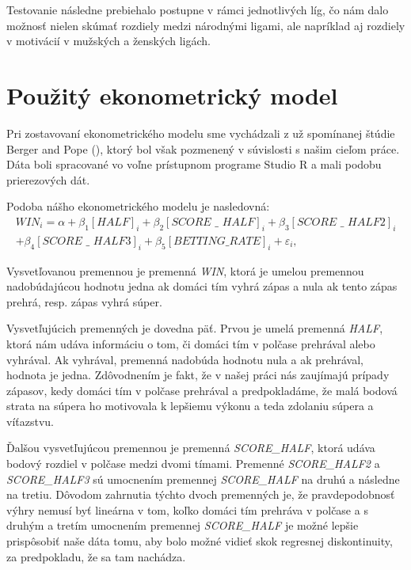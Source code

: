 \documentclass[
  digital, %
  oneside, %
  notable,   %
  lof,     %
  lot,     %
]{fithesis3}
\begin{document}
		Testovanie následne prebiehalo postupne v rámci jednotlivých líg, čo nám dalo možnosť nielen skúmať rozdiely medzi národnými ligami, ale napríklad aj rozdiely v motivácií v mužských a ženských ligách.
		
		\section{Použitý ekonometrický model}
		\label{sec:pouzitymodel}
		Pri zostavovaní ekonometrického modelu sme vychádzali z už spomínanej štúdie Berger and Pope (\citeyear{berger2011}), ktorý bol však pozmenený v súvislosti s našim cieľom práce. Dáta boli spracované vo voľne prístupnom programe Studio R a mali podobu prierezových dát.
		
		Podoba nášho ekonometrického modelu je nasledovná:
		\begin{multline}
		WIN_{i} = \alpha + \beta _{1} [\textit{HALF}]_{i} + \beta _{2} [\textit{SCORE~\_~HALF}]_{i} + \beta _{3} [\textit{SCORE~\_~HALF2}]_{i} \\
		+ \beta _{4} [\textit{SCORE~\_~HALF3}]_{i} + \beta _{5} [\textit{BETTING\_RATE}]_{i} + \varepsilon_{i},
		\end{multline}
		
		Vysvetľovanou premennou je premenná \textit{WIN}, ktorá je umelou premennou nadobúdajúcou hodnotu jedna ak domáci tím vyhrá zápas a nula ak tento zápas prehrá, resp. zápas vyhrá súper. 
		
		Vysvetľujúcich premenných je dovedna päť. Prvou je umelá premenná \textit{HALF}, ktorá nám udáva informáciu o tom, či domáci tím v polčase prehrával alebo vyhrával. Ak vyhrával, premenná nadobúda hodnotu nula a ak prehrával, hodnota je jedna. Zdôvodnením je fakt, že v našej práci nás zaujímajú prípady zápasov, kedy domáci tím v polčase prehrával a predpokladáme, že malá bodová strata na súpera ho motivovala k lepšiemu výkonu a teda zdolaniu súpera a víťazstvu. 
		
		Ďalšou vysvetľujúcou premennou je premenná \textit{SCORE\_HALF}, ktorá udáva bodový rozdiel v polčase medzi dvomi tímami. Premenné \textit{SCORE\_HALF2} a \textit{SCORE\_HALF3} sú umocnením premennej \textit{SCORE\_HALF} na druhú a následne na tretiu. Dôvodom zahrnutia týchto dvoch premenných je, že pravdepodobnosť výhry nemusí byť lineárna v tom, koľko domáci tím prehráva v polčase a s druhým a tretím umocnením premennej \textit{SCORE\_HALF} je možné lepšie prispôsobiť naše dáta tomu, aby bolo možné vidieť skok regresnej diskontinuity,  za predpokladu, že sa tam nachádza.
		
\end{document}
